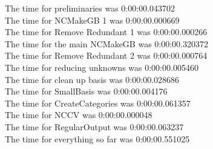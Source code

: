 \documentclass[rep10,leqno]{report}
\begin{document}
\noindent
The time for preliminaries was 0:00:00.043702\\
The time for NCMakeGB 1 was 0:00:00.000669\\
The time for Remove Redundant 1 was 0:00:00.000266\\
The time for the main NCMakeGB was 0:00:00.320372\\
The time for Remove Redundant 2 was 0:00:00.000764\\
The time for reducing unknowns was 0:00:00.005460\\
The time for clean up basis was 0:00:00.028686\\
The time for SmallBasis was 0:00:00.004176\\
The time for CreateCategories was 0:00:00.061357\\
The time for NCCV was 0:00:00.000048\\
The time for RegularOutput was 0:00:00.063237\\
The time for everything so far was 0:00:00.551025\\
\end{document}

